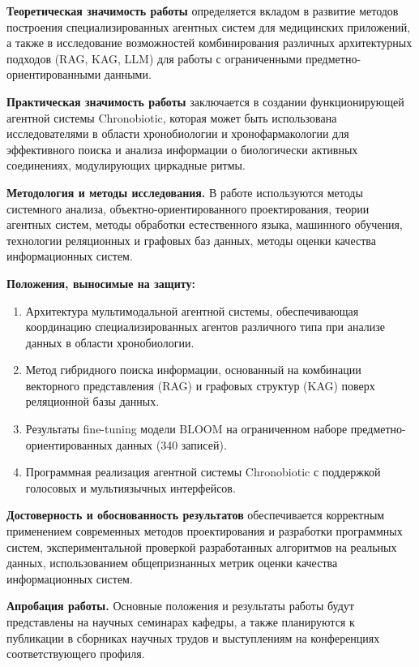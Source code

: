 \documentclass[a4paper,14pt]{extarticle}
\begin{document}
	\textbf{Теоретическая значимость работы} определяется вкладом в развитие методов построения специализированных агентных систем для медицинских приложений, а также в исследование возможностей комбинирования различных архитектурных подходов (RAG, KAG, LLM) для работы с ограниченными предметно-ориентированными данными.
	
	\textbf{Практическая значимость работы} заключается в создании функционирующей агентной системы Chronobiotic, которая может быть использована исследователями в области хронобиологии и хронофармакологии для эффективного поиска и анализа информации о биологически активных соединениях, модулирующих циркадные ритмы.
	
	\textbf{Методология и методы исследования.} В работе используются методы системного анализа, объектно-ориентированного проектирования, теории агентных систем, методы обработки естественного языка, машинного обучения, технологии реляционных и графовых баз данных, методы оценки качества информационных систем.
	
	\textbf{Положения, выносимые на защиту:}
	\begin{enumerate}
		\item Архитектура мультимодальной агентной системы, обеспечивающая координацию специализированных агентов различного типа при анализе данных в области хронобиологии.
		\item Метод гибридного поиска информации, основанный на комбинации векторного представления (RAG) и графовых структур (KAG) поверх реляционной базы данных.
		\item Результаты fine-tuning модели BLOOM на ограниченном наборе предметно-ориентированных данных (340 записей).
		\item Программная реализация агентной системы Chronobiotic с поддержкой голосовых и мультиязычных интерфейсов.
	\end{enumerate}
	
	\textbf{Достоверность и обоснованность результатов} обеспечивается корректным применением современных методов проектирования и разработки программных систем, экспериментальной проверкой разработанных алгоритмов на реальных данных, использованием общепризнанных метрик оценки качества информационных систем.
	
	\textbf{Апробация работы.} Основные положения и результаты работы будут представлены на научных семинарах кафедры, а также планируются к публикации в сборниках научных трудов и выступлениям на конференциях соответствующего профиля.
	
\end{document}
